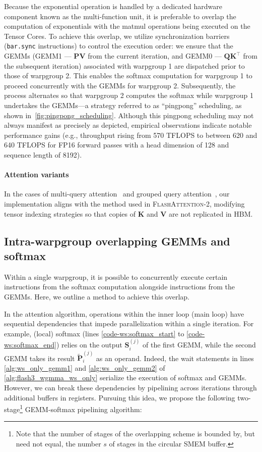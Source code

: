 Because the exponential operation is handled by a dedicated hardware component known as the multi-function unit, it is preferable to overlap the computation of exponentials with the matmul operations being executed on the Tensor Cores. To achieve this overlap, we utilize synchronization barriers (\texttt{bar.sync} instructions) to control the execution order: we ensure that the GEMMs (GEMM1 — $\mathbf{P} \mathbf{V}$ from the current iteration, and GEMM0 — $\mathbf{Q} \mathbf{K}^\top$ from the subsequent iteration) associated with warpgroup 1 are dispatched prior to those of warpgroup 2. This enables the softmax computation for warpgroup 1 to proceed concurrently with the GEMMs for warpgroup 2. Subsequently, the process alternates so that warpgroup 2 computes the softmax while warpgroup 1 undertakes the GEMMs—a strategy referred to as “pingpong” scheduling, as shown in~\cref{fig:pingpong_scheduling}. Although this pingpong scheduling may not always manifest as precisely as depicted, empirical observations indicate notable performance gains (e.g., throughput rising from 570 TFLOPS to between 620 and 640 TFLOPS for FP16 forward passes with a head dimension of 128 and sequence length of 8192).

\paragraph{Attention variants} In the cases of multi-query attention~\citep{shazeer2019fast} and grouped query attention~\citep{ainslie2023gqa}, our implementation aligns with the method used in \textsc{FlashAttention-2}, modifying tensor indexing strategies so that copies of $\mathbf{K}$ and $\mathbf{V}$ are not replicated in HBM.

\subsection{Intra-warpgroup overlapping GEMMs and softmax}

Within a single warpgroup, it is possible to concurrently execute certain instructions from the softmax computation alongside instructions from the GEMMs. Here, we outline a method to achieve this overlap.

In the attention algorithm, operations within the inner loop (main loop) have sequential dependencies that impede parallelization within a single iteration. For example, (local) softmax (lines \ref{code-ws:softmax_start} to \ref{code-ws:softmax_end}) relies on the output $\mathbf{S}_i^{(j)}$ of the first GEMM, while the second GEMM takes its result $\widetilde{\mathbf{P}}_i^{(j)}$ as an operand. Indeed, the wait statements in lines \ref{alg:ws_only_gemm1} and \ref{alg:ws_only_gemm2} of \cref{alg:flash3_wgmma_ws_only} serialize the execution of softmax and GEMMs. However, we can break these dependencies by pipelining across iterations through additional buffers in registers. Pursuing this idea, we propose the following two-stage\footnote{Note that the number of stages of the overlapping scheme is bounded by, but need not equal, the number $s$ of stages in the circular SMEM buffer.} GEMM-softmax pipelining algorithm:

